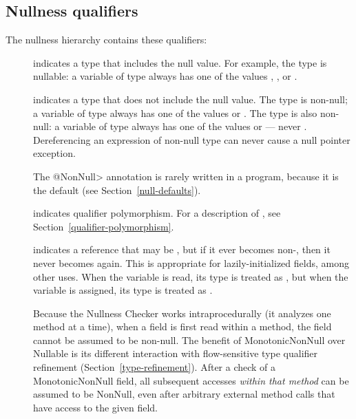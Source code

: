 \subsection{Nullness qualifiers\label{nullness-qualifiers}}

The nullness hierarchy contains these qualifiers:

\begin{description}

\item[]
  indicates a type that includes the null value.  For example, the type 
  is nullable:  a variable of type  always has one of the
  values , , or .

\item[]
  indicates a type that does not include the null value.  The type
   is non-null; a variable of type  always has
  one of the values  or .  The type  is also non-null:  a variable of type 
  always has one of the values  or  --- never
  .  Dereferencing an expression of non-null type can never cause
  a null pointer exception.

  The \<@NonNull> annotation is rarely written in a program, because it is
  the default (see Section~\ref{null-defaults}).

\item[]
  indicates qualifier polymorphism.  For a description of
  , see
  Section~\ref{qualifier-polymorphism}.

\item[]
  indicates a reference that may be , but if it ever becomes
  non-, then it never becomes  again.  This is
  appropriate for lazily-initialized fields, among other uses.  When the
  variable is read, its type is treated as
  , but when the variable is
  assigned, its type is treated as
  .

  \begin{sloppypar}
  Because the Nullness Checker works intraprocedurally (it analyzes one
  method at a time), when a  field is first read within a
  method, the field cannot be assumed to be non-null.  The benefit of
  MonotonicNonNull over Nullable is its different interaction with
  flow-sensitive type qualifier refinement (Section~\ref{type-refinement}).
  After a check of a MonotonicNonNull
  field, all subsequent accesses \emph{within that method} can be assumed
  to be NonNull, even after arbitrary external method calls that have
  access to the given field.
  \end{sloppypar}


\end{description}
